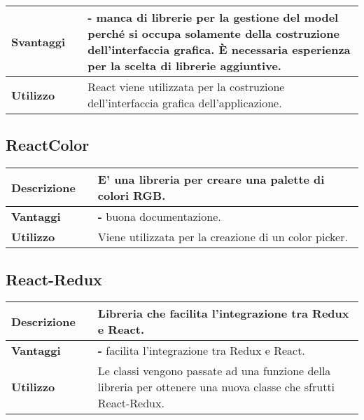 \begin{table}[H]
	\centering
	\begin{tabular}{p{2cm}p{0.5cm}p{11.5cm}}
		\arrayrulecolor{lightgray}
		\toprule	
		\textbf{Svantaggi} & &
		\textbf{- }manca di librerie per la gestione del model perché si occupa solamente della costruzione dell'interfaccia grafica. È necessaria esperienza per la scelta di librerie aggiuntive.
		\\ \midrule
		\textbf{Utilizzo} & &
		React viene utilizzata per la costruzione dell'interfaccia grafica dell'applicazione.
		\\ \bottomrule
	\end{tabular}
\end{table}


\vspace{40px}
\subsection{ReactColor}
\label{ReactColor}
\begin{table}[H]
	\centering
	\begin{tabular}{p{2cm}p{0.5cm}p{11.5cm}}
		\arrayrulecolor{lightgray}
		\toprule
		\textbf{Descrizione} & &
		E' una libreria \js{} per creare una palette di colori RGB.
		\\ \midrule
		\textbf{Vantaggi} & &
		\textbf{- }buona documentazione.
		\\ \midrule
		\textbf{Utilizzo} & &
		Viene  utilizzata per la creazione di un color picker.
		\\ \bottomrule
	\end{tabular}
\end{table}



\vspace{40px}
\subsection{React-Redux}
\label{React-Redux}
\begin{table}[H]
	\centering
	\begin{tabular}{p{2cm}p{0.5cm}p{11.5cm}}
		\arrayrulecolor{lightgray}
		\toprule
		\textbf{Descrizione} & &
		Libreria che facilita l'integrazione tra Redux e React.
		\\ \midrule
		\textbf{Vantaggi} & &
		\textbf{- }facilita l'integrazione tra Redux e React.
		\\ \midrule
		\textbf{Utilizzo} & &
		Le classi \js{} vengono passate ad una funzione della libreria per ottenere una nuova classe che sfrutti React-Redux.
		\\ \bottomrule
	\end{tabular}
\end{table}




